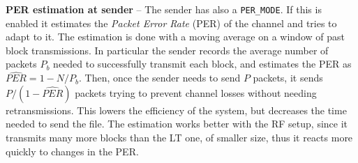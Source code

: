 \textbf{PER estimation at sender} -- 
The sender has also a \texttt{PER\_MODE}. If this is enabled it estimates the \textit{Packet Error Rate} (PER) of the channel and tries to adapt to it. The estimation is done with a moving average on a window of past block transmissions. In particular the sender records the average number of packets $P_b$ needed to successfully transmit each block, and estimates the PER as $\widehat{PER} = 1 - N/P_b$. Then, once the sender needs to send $P$ packets, it sends $P/(1-\widehat{PER})$ packets trying to prevent channel losses without needing retransmissions. This lowers the efficiency of the system, but decreases the time needed to send the file. The estimation works better with the RF setup, since it transmits many more blocks than the LT one, of smaller size, thus it reacts more quickly to changes in the PER.

